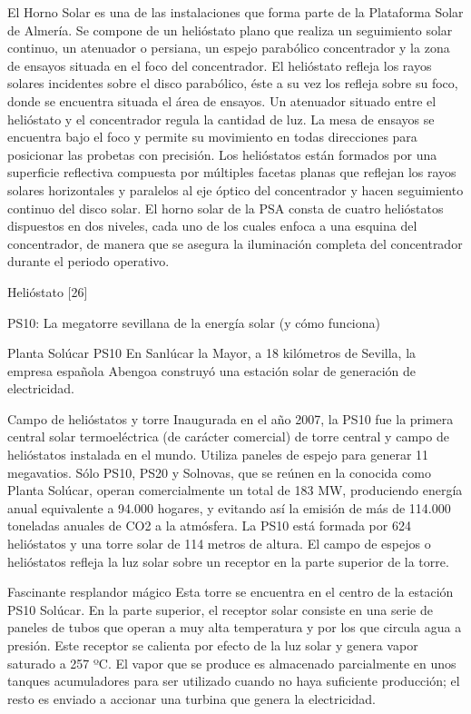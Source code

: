 \documentclass[12pt]{article}
\begin{document}
El Horno Solar es una de las instalaciones que forma parte de la Plataforma Solar de Almería. Se compone de un helióstato plano que realiza un seguimiento solar continuo, un atenuador o persiana, un espejo parabólico concentrador y la zona de ensayos situada en el foco del concentrador.
            	El helióstato refleja los rayos solares incidentes sobre el disco parabólico, éste a su vez los refleja sobre su foco, donde se encuentra situada el área de ensayos. Un atenuador situado entre el helióstato y el concentrador regula la cantidad de luz. La mesa de ensayos se encuentra bajo el foco y permite su movimiento en todas direcciones para posicionar las probetas con precisión.
            	Los helióstatos están formados por una superficie reflectiva compuesta por múltiples facetas planas que reflejan los rayos solares horizontales y paralelos al eje óptico del concentrador y hacen seguimiento continuo del disco solar. El horno solar de la PSA consta de cuatro helióstatos dispuestos en dos niveles, cada uno de los cuales enfoca a una esquina del concentrador, de manera que se asegura la iluminación completa del concentrador durante el periodo operativo.

Helióstato
[26]


PS10: La megatorre sevillana de la energía solar (y cómo funciona)
 

Planta Solúcar PS10
En Sanlúcar la Mayor, a 18 kilómetros de Sevilla, la empresa española Abengoa construyó una estación solar de generación de electricidad.

Campo de helióstatos y torre
Inaugurada en el año 2007, la PS10 fue la primera central solar termoeléctrica (de carácter comercial) de torre central y campo de helióstatos instalada en el mundo. Utiliza paneles de espejo para generar 11 megavatios.
Sólo PS10, PS20 y Solnovas, que se reúnen en la conocida como Planta Solúcar, operan comercialmente un total de 183 MW, produciendo energía anual equivalente a 94.000 hogares, y evitando así la emisión de más de 114.000 toneladas anuales de CO2 a la atmósfera.
La PS10 está formada por 624 helióstatos y una torre solar de 114 metros de altura. El campo de espejos o helióstatos refleja la luz solar sobre un receptor en la parte superior de la torre.

Fascinante resplandor mágico
Esta torre se encuentra en el centro de la estación PS10 Solúcar. En la parte superior, el receptor solar consiste en una serie de paneles de tubos que operan a muy alta temperatura y por los que circula agua a presión. Este receptor se calienta por efecto de la luz solar y genera vapor saturado a 257 ºC. El vapor que se produce es almacenado parcialmente en unos tanques acumuladores para ser utilizado cuando no haya suficiente producción; el resto es enviado a accionar una turbina que genera la electricidad.
\end{document}
